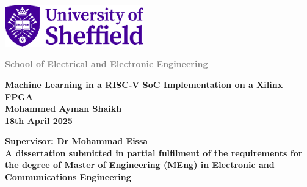 \documentclass[a4paper,12pt]{report}
\begin{document}
\begin{titlepage}
    \begin{minipage}{0.49\textwidth}
        \includegraphics[width=6cm]{figures/school_logo.png} %
    \end{minipage}
    \begin{minipage}{0.49\textwidth}
        \flushleft
        \textcolor{gray}{\Huge\textbf{School of Electrical and Electronic Engineering}}
    \end{minipage}

    \vspace{5cm} %

    \begin{center}
        \LARGE\textbf{Machine Learning in a RISC-V SoC Implementation on a Xilinx FPGA} \\[1.5cm]

        \Large\textbf{Mohammed Ayman Shaikh} \\[1cm]

        \large\textbf{18th April 2025} \\[7cm]
    \end{center}

    \flushleft
    \large\textbf{Supervisor: Dr Mohammad Eissa} \\[1cm]

    \large\textbf{A dissertation submitted in partial fulfilment of the requirements for the degree of Master of Engineering  (MEng) in Electronic and Communications Engineering
    }

\end{titlepage}

    
\end{document}
